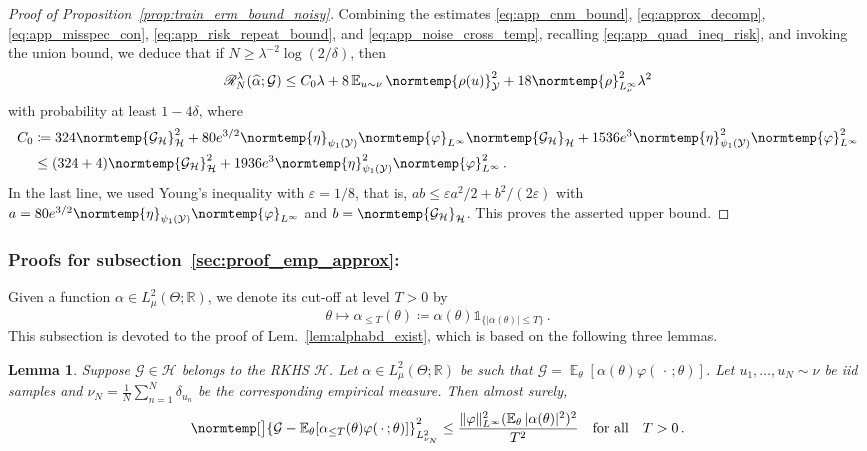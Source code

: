 \documentclass{article}
\theoremstyle{plain}
\newtheorem{lemma}[theorem]{Lemma}
\theoremstyle{my_def}
\theoremstyle{my_rem}
\numberwithin{equation}{section}
\numberwithin{theorem}{section}%
\newcommand{\R}{\mathbb{R}}
\newcommand{\E}{\mathbb{E}}
\newcommand{\scrR}{\mathscr{R}}
\newcommand{\cG}{\mathcal{G}}
\newcommand{\cH}{\mathcal{H}}
\newcommand{\cY}{\mathcal{Y}}
\newcommand{\one}{\mathds{1}}%
\let\originalleft\left %
\let\originalright\right
\renewcommand{\left}{\mathopen{}\mathclose\bgroup\originalleft}
\renewcommand{\right}{\aftergroup\egroup\originalright}
\newcommand{\norm}{\normtemp}
\renewcommand{\hat}{\widehat}
\newcommand{\slot}{{\,\cdot\,}}
\newcommand{\defeq}{\coloneqq} %
\renewcommand{\E}{\operatorname{\mathbb{E}}} %
\newcommand{\al}{\alpha}
\def\qfa{\quad\text{for all}\quad}
\newcommand{\GH}{\cG_{\cH}}
\newcommand{\eps}{\varepsilon}
\renewcommand{\phi}{\varphi}
\begin{document}
\begin{proof}[Proof of Proposition~\ref{prop:train_erm_bound_noisy}]
    Combining the estimates \eqref{eq:app_cnm_bound}, \eqref{eq:approx_decomp}, \eqref{eq:app_misspec_con}, \eqref{eq:app_risk_repeat_bound}, and \eqref{eq:app_noise_cross_temp}, recalling \eqref{eq:app_quad_ineq_risk}, and invoking the union bound, we deduce that if $N\geq \lambda^{-2}\log(2/\delta)$, then
    \begin{equation*}%
        \scrR_N^\lambda(\hat{\alpha};\cG) \leq C_0 \lambda + 8 \E_{u\sim\nu}\norm{\rho(u)}_{\cY}^2 + 18\norm{\rho}_{L^\infty_\nu}^2\lambda^2
    \end{equation*}
    with probability at least $1-4\delta$, where
    \begin{align*}%
        C_0 &\defeq 324\norm{\GH}_\cH^2 +
        80e^{3/2}\norm{\eta}_{\psi_1(\cY)}\norm{\phi}_{L^\infty}\norm{\GH}_\cH
        + 1536e^{3}\norm{\eta}_{\psi_1(\cY)}^2\norm{\phi}_{L^\infty}^2\\
        &\leq (324 + 4)\norm{\GH}_\cH^2
        + 1936e^{3}\norm{\eta}_{\psi_1(\cY)}^2\norm{\phi}_{L^\infty}^2\,.
    \end{align*}
    In the last line, we used Young's inequality with $\eps=1/8$, that is, $ab\leq \eps a^2/2+b^2/(2\eps)$ with $a=80e^{3/2}\norm{\eta}_{\psi_1(\cY)}\norm{\phi}_{L^\infty}$ and $b=\norm{\GH}_\cH$. This proves the asserted upper bound.
\end{proof}

\subsubsection{Proofs for subsection~\ref{sec:proof_emp_approx}:~}\label{app:proof_proof_emp_approx}
Given a function $\al \in L^2_\mu(\Theta;\R)$, we denote its cut-off at level $T> 0$ by
\begin{equation}\label{eq:app_def_cutoff}
    \theta\mapsto \al_{\le T}(\theta) \defeq \al(\theta) \one_{\{|\al(\theta)|\le T\}}\,.
\end{equation}
This subsection is devoted to the proof of Lem.~\ref{lem:alphabd_exist}, which is based on the following three lemmas. 
\begin{lemma}
\label{lem:1}
Suppose $\cG \in \cH$ belongs to the RKHS $\cH$. Let $\al\in L^2_\mu(\Theta;\R)$ be such that $\cG = \E_\theta[ \al(\theta) \phi(\slot; \theta)]$. 
Let $u_1,\dots, u_N \sim \nu$ be iid samples and $\nu_N = \frac{1}{N} \sum_{n=1}^N \delta_{u_n}$ be the corresponding empirical measure. Then almost surely,
\begin{equation}\label{eq:app_lem_trunc}
    \norm[\big]{\cG - \E_\theta\left[ \alpha_{\le T}(\theta) \phi(\slot;\theta) \right]}^2_{L^2_{\nu_N}}
    \le 
    \frac{\Vert \phi \Vert_{L^\infty}^2 (\E_\theta|\al(\theta)|^2)^2}{T^2} \qfa T>0\,.
\end{equation}
\end{lemma}
\end{document}
